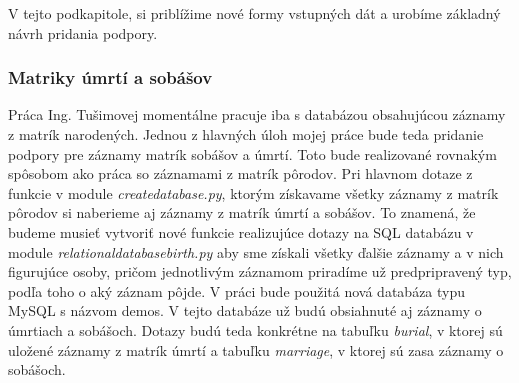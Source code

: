 V tejto podkapitole, si priblížime nové formy vstupných dát a urobíme základný návrh
pridania podpory.

\subsubsection{Matriky úmrtí a sobášov}

Práca Ing. Tušimovej momentálne pracuje iba s databázou obsahujúcou záznamy z matrík
narodených. Jednou z hlavných úloh mojej práce bude teda pridanie podpory pre záznamy
matrík sobášov a úmrtí. Toto bude realizované rovnakým spôsobom ako práca so
záznamami z matrík pôrodov. Pri hlavnom dotaze z funkcie v module \textit{create\textunderscore database.py}, ktorým
získavame všetky záznamy z matrík pôrodov si naberieme aj záznamy z matrík úmrtí
a sobášov. To znamená, že budeme musieť vytvoriť nové funkcie realizujúce dotazy na SQL databázu v module \textit{relational\textunderscore database\textunderscore birth.py} aby sme získali všetky ďalšie záznamy a v nich figurujúce osoby, pričom jednotlivým záznamom priradíme už predpripravený typ, podľa toho o aký
záznam pôjde. V práci bude použitá nová databáza typu MySQL s názvom demos. V tejto databáze už budú obsiahnuté aj záznamy o úmrtiach a sobášoch. Dotazy budú teda konkrétne na tabuľku \textit{burial}, v ktorej sú uložené záznamy z matrík úmrtí a tabuľku \textit{marriage}, v ktorej sú zasa záznamy o sobášoch.

